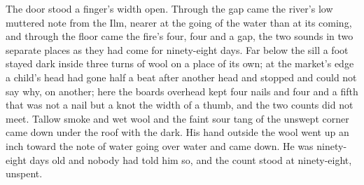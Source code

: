 The door stood a finger's width open. Through the gap came the river's low muttered note from the Ilm, nearer at the going of the water than at its coming, and through the floor came the fire's four, four and a gap, the two sounds in two separate places as they had come for ninety-eight days. Far below the sill a foot stayed dark inside three turns of wool on a place of its own; at the market's edge a child's head had gone half a beat after another head and stopped and could not say why, on another; here the boards overhead kept four nails and four and a fifth that was not a nail but a knot the width of a thumb, and the two counts did not meet. Tallow smoke and wet wool and the faint sour tang of the unswept corner came down under the roof with the dark. His hand outside the wool went up an inch toward the note of water going over water and came down. He was ninety-eight days old and nobody had told him so, and the count stood at ninety-eight, unspent.
